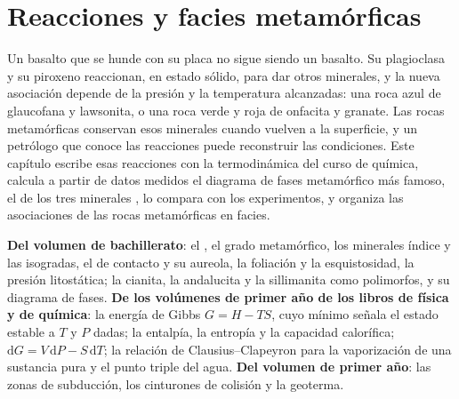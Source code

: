 \chapter{Reacciones y facies metamórficas}\label{ch:b2:metamorphic-facies}

Un basalto que se hunde con su placa no sigue siendo un basalto. Su plagioclasa y su piroxeno
reaccionan, en estado sólido, para dar otros minerales, y la nueva asociación depende de la
presión y la temperatura alcanzadas: una roca azul de glaucofana y lawsonita, o una
roca verde y roja de onfacita y granate. Las rocas metamórficas conservan esos minerales cuando
vuelven a la superficie, y un petrólogo que conoce las reacciones puede reconstruir las
condiciones. Este capítulo escribe esas reacciones con la termodinámica del curso de
química, calcula a partir de datos medidos el diagrama de fases metamórfico más famoso,
el de los tres minerales , lo compara con los experimentos, y organiza las
asociaciones de las rocas metamórficas en facies.

\begin{recall}
\textbf{Del volumen de bachillerato}: el , el grado metamórfico, los minerales índice
y las isogradas, el  de contacto y su aureola, la foliación y la esquistosidad,
la presión litostática; la cianita, la andalucita y la sillimanita como polimorfos, y su
diagrama de fases. \textbf{De los volúmenes de primer año de los libros de física y de química}: la
energía de Gibbs $G = H - TS$, cuyo mínimo señala el estado estable a $T$ y $P$ dadas;
la entalpía, la entropía y la capacidad calorífica; $\mathrm dG = V\,\mathrm dP - S\,\mathrm dT$; la
relación de Clausius--Clapeyron para la vaporización de una sustancia pura y el punto
triple del agua. \textbf{Del volumen de primer año}: las zonas de subducción, los cinturones de colisión y
la geoterma.
\end{recall}


